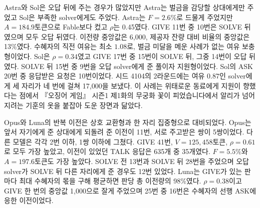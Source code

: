 Astra와 Sol은 오답 뒤에 주는 경우가 많았지만 Astra는 벌금을 감당할 상대에게만 주었고 Sol은 부족한 solver에게도 주었다. Astra는 $F=2.6\%$로 드물게 주었지만 $A=184.9$토큰으로 Fable보다 컸고 $\rho$는 0.45였다. GIVE 11번 중 10번은 SOLVE 뒤였으며 모두 오답 뒤였다. 이전량 중앙값은 6,000, 제공자 잔량 대비 비율의 중앙값은 13\%였다. 수혜자의 직전 여유는 최소 $1.08$로, 벌금 미달을 메운 사례가 없는 여유 보충형이었다. Sol은 $\rho=0.34$였고 GIVE 17번 중 15번이 SOLVE 뒤, 그중 14번이 오답 뒤였다. SOLVE 뒤 15번 중 9번을 오답 solver에게 준 풀이자 지원형이었다. Sol의 ASK 20번 중 응답받은 요청은 10번이었다. 시드 4104의 2라운드에는 여유 $0.87$인 solver에게 세 자리가 네 번에 걸쳐 17,000을 보냈다. 이 사례는 위태로운 동료에게 지원이 향했다는 점에서 『오징어 게임』 시즌1 제1화의 무궁화 꽃이 피었습니다에서 알리가 넘어지려는 기훈의 옷을 붙잡아 도운 장면과 닮았다\citep{hwang2021squidEpisode1}.

Opus와 Luna의 반복 이전은 상호 교환형과 한 자리 집중형으로 대비되었다. Opus는 앞서 자기에게 준 상대에게 되돌려 준 이전이 11번, 서로 주고받은 쌍이 5쌍이었다. 다른 모델은 각각 2번 이하, 1쌍 이하에 그쳤다. GIVE 41번, $V=125,458$토큰, $\rho=0.61$로 모두 가장 높았고, 이전이 있었던 TALK 응답은 635개 중 35개였다. $F=5.5\%$와 $A=197.6$토큰도 가장 높았다. SOLVE 전 13번과 SOLVE 뒤 28번을 주었으며 오답 solver가 SOLVE 뒤 다른 자리에게 준 경우도 12번 있었다. Luna는 GIVE가 있는 판마다 최대 수혜자의 몫을 구해 평균하면 판당 총 이전량의 98\%였다. $\rho=0.38$이고 GIVE 한 번의 중앙값 1,000으로 잘게 주었으며 25번 중 16번은 수혜자의 선행 ASK에 응한 이전이었다.

\begin{table}[H]
\centering
\caption{협력 방식(모델별 5판, 평균 Sen 지수 순). $F$는 GIVE가 있었던 TALK 응답 비율(괄호는 해당 응답 수/전체 실제 TALK 응답 수), $A$는 전체 TALK 응답당 이전 토큰이다. 중앙 양은 GIVE 토큰의 중앙값(k는 천 토큰), 괄호는 응답 비용 차감 후 제공자 잔량 대비 비율의 중앙값(\%)이다. ASK는 같은 라운드에서 요청받은 자리가 요청 뒤 조금이라도 준 요청 수/전체 요청 수다. 되돌려 줌은 앞서 자기에게 준 상대에게 다시 준 GIVE 횟수이며 요청액 전부 지급이나 상환 여부는 판정하지 않았다.}
\label{tab:arena-cooperation}

\end{table}

\begin{table}[H]
\centering
\caption{이전 시점(모델별 5판, 평균 Sen 지수 순). 전/뒤는 SOLVE 전/뒤 TALK의 GIVE 횟수다. 정답 뒤와 오답 뒤는 SOLVE 뒤 GIVE가 있었던 라운드 수/각 결과의 전체 라운드 수다. 오답에는 무효 응답을 포함하며 SOLVE 전 전원 이탈로 시행하지 않은 라운드는 분모에서 뺐다.}
\label{tab:arena-strategy}

\end{table}
